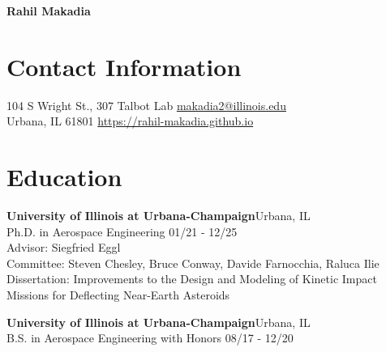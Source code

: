 \documentclass[margin,line]{res}
\newlength{\myspacing}
\newif\ifphone
\begin{document}
\ifphone
\hspace{\myspacing}\huge{\bf Rahil Makadia} \hfill \large{Cell: }
\else
\hspace{\myspacing}\huge{\bf Rahil Makadia}
\fi

\normalsize
\begin{resume}

\section{\sc Contact Information}
104 S Wright St., 307 Talbot Lab \hfill \href{mailto:makadia2@illinois.edu}{makadia2@illinois.edu}\\
Urbana, IL 61801 \hfill \href{https://rahil-makadia.github.io/}{https://rahil-makadia.github.io}

\section{\sc Education}
{\bf University of Illinois at Urbana-Champaign}\hfill Urbana, IL\\
Ph.D. in Aerospace Engineering \hfill {01/21 - 12/25}\\
Advisor: Siegfried Eggl\\
Committee: Steven Chesley, Bruce Conway, Davide Farnocchia, Raluca Ilie\\
Dissertation: Improvements to the Design and Modeling of Kinetic Impact Missions for Deflecting Near-Earth Asteroids

{\bf University of Illinois at Urbana-Champaign}\hfill Urbana, IL\\
B.S. in Aerospace Engineering with Honors \hfill {08/17 - 12/20}


\end{resume}
\end{document}

